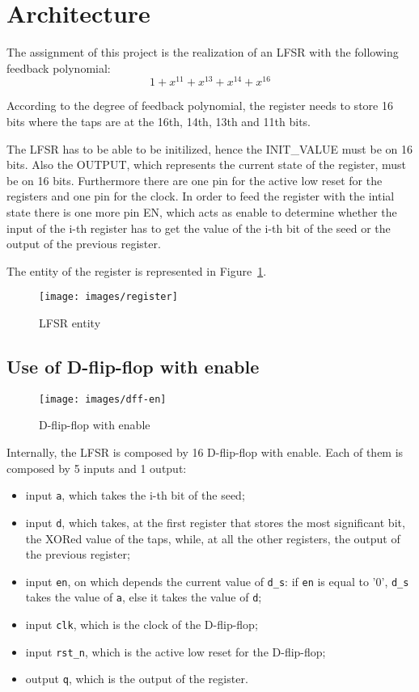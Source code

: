 \documentclass[11pt,a4paper,oneside, openright]{article}
\begin{document}
\section{Architecture}

The assignment of this project is the realization of an LFSR with the following feedback polynomial:
$$ 1 + x^{11} + x^{13} + x^{14} + x^{16} $$

According to the degree of feedback polynomial, the register needs to store 16 bits where the taps are at the 16th, 14th, 13th and 11th bits.

The LFSR has to be able to be initilized, hence the INIT\_VALUE must be on 16 bits. Also the OUTPUT, which represents the current state of the register, must be on 16 bits. Furthermore there are one pin for the active low reset for the registers and one pin for the clock. In order to feed the register with the intial state there is one more pin EN, which acts as enable to determine whether the input of the i-th register has to get the value of the i-th bit of the seed or the output of the previous register.

The entity of the register is represented in Figure~\ref{fig:register}.

\begin{figure}[h]
    \centering
    \texttt{[image: images/register]}
    \caption{LFSR entity}
    \label{fig:register}
\end{figure}

\subsection{Use of D-flip-flop with enable}

\begin{figure}[h]
    \centering
    \texttt{[image: images/dff-en]}
    \caption{D-flip-flop with enable}
    \label{fig:dff-en}
\end{figure}

Internally, the LFSR is composed by 16 D-flip-flop with enable. Each of them is composed by 5 inputs and 1 output:
\begin{itemize}
    \item input \texttt{a}, which takes the i-th bit of the seed;
    \item input \texttt{d}, which takes, at the first register that stores the most significant bit, the XORed value of the taps, while, at all the other registers, the output of the previous register;
    \item input \texttt{en}, on which depends the current value of \texttt{d\_s}: if \texttt{en} is equal to '0', \texttt{d\_s} takes the value of \texttt{a}, else it takes the value of \texttt{d};
    \item input \texttt{clk}, which is the clock of the D-flip-flop;
    \item input \texttt{rst\_n}, which is the active low reset for the D-flip-flop;
    \item output \texttt{q}, which is the output of the register.
    \end{itemize}
  
\end{document}

